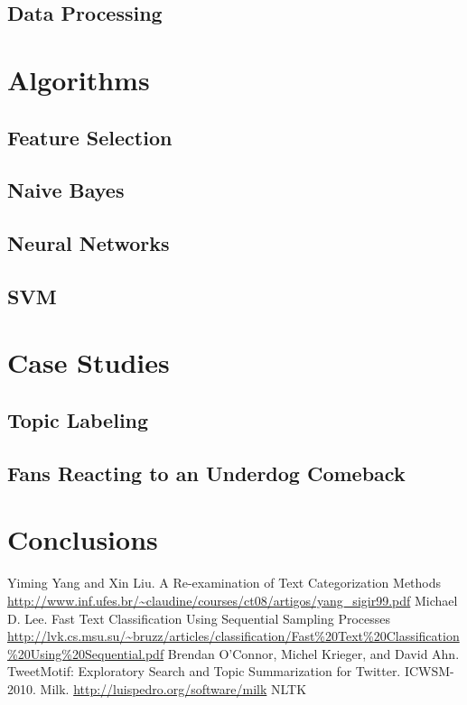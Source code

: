 \documentclass[fontsize=10pt,twocolumn,letterpaper,abstracton]{scrartcl}
\begin{document}
\subsection{Data Processing}

\section{Algorithms}
\subsection{Feature Selection}
\subsection{Naive Bayes}
\subsection{Neural Networks}
\subsection{SVM}

\section{Case Studies}

\subsection{Topic Labeling}

\subsection{Fans Reacting to an Underdog Comeback}

\section{Conclusions}

\begin{thebibliography}{1}

 Yiming Yang and Xin Liu. A Re-examination of Text Categorization Methods \url{http://www.inf.ufes.br/~claudine/courses/ct08/artigos/yang_sigir99.pdf}
 Michael D. Lee. Fast Text Classification Using Sequential Sampling Processes \url{http://lvk.cs.msu.su/~bruzz/articles/classification/Fast%20Text%20Classification%20Using%20Sequential.pdf}
 Brendan O'Connor, Michel Krieger, and David Ahn. TweetMotif: Exploratory Search and Topic Summarization for Twitter. ICWSM-2010.
 Milk. \url{http://luispedro.org/software/milk}
 NLTK

\end{thebibliography}
\end{document}
